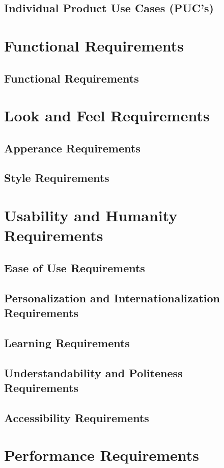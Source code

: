 \documentclass[]{article}
\begin{document}
\subsection{Individual Product Use Cases (PUC's)}

\section{Functional Requirements}
\subsection{Functional Requirements}

\section{Look and Feel Requirements}
\subsection{Apperance Requirements}
\subsection{Style Requirements}

\section{Usability and Humanity Requirements}
\subsection{Ease of Use Requirements}
\subsection{Personalization and Internationalization Requirements}
\subsection{Learning Requirements}
\subsection{Understandability and Politeness Requirements}
\subsection{Accessibility Requirements}

\section{Performance Requirements}
\end{document}
